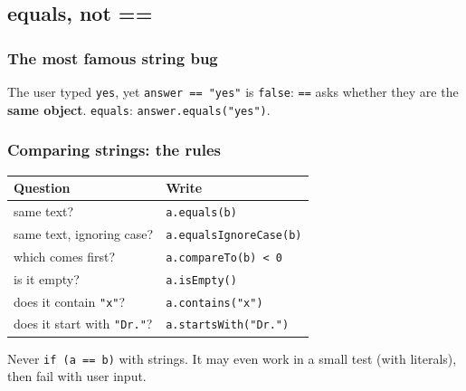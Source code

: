 \documentclass[aspectratio=169,10pt,compress]{beamer}
\begin{document}
\subsection[Bug]{equals, not ==}




\begin{frame}[t,fragile] \frametitle{The most famous string bug}

  \vspace{0.3em}
  \small The user typed \texttt{yes}, yet \texttt{answer == "yes"} is \texttt{false}: \texttt{==} asks whether they are
  the \textbf{same object}.  \texttt{equals}: \texttt{answer.equals("yes")}.
\end{frame}




\begin{frame}[t,fragile] \frametitle{Comparing strings: the rules}
  \small
  \begin{tabular}{@{}L{0.4\textwidth}L{0.5\textwidth}@{}}
    \toprule
    \textbf{Question}                     & \textbf{Write} \\
    \midrule
    same text?                            & \texttt{a.equals(b)} \\
    same text, ignoring case?             & \texttt{a.equalsIgnoreCase(b)} \\
    which comes first?                    & \texttt{a.compareTo(b) < 0} \\
    is it empty?                          & \texttt{a.isEmpty()} \\
    does it contain \texttt{"x"}?         & \texttt{a.contains("x")} \\
    does it start with \texttt{"Dr."}?    & \texttt{a.startsWith("Dr.")} \\
    \bottomrule
  \end{tabular}

  \vspace{0.8em}
  \begin{alertblock}{Never}
    \texttt{if (a == b)} with strings. It may even work in a small test (with literals), then fail with user input.
  \end{alertblock}
\end{frame}
\end{document}
